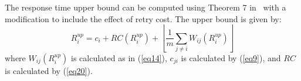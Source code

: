 \documentclass[letter]{sig-alternate}
\begin{document}
The response time upper bound can be computed using Theorem 7 in~\cite{key-2} with a modification to include the effect of retry cost. The upper bound is given by:
\begin{equation}
R_{i}^{up}=c_{i}+RC(R_{i}^{up})+\left\lfloor\frac{1}{m}\sum_{j\ne i}W_{ij}(R_{i}^{up})\right\rfloor\label{eq22}\end{equation}
where $W_{ij}(R_{i}^{up})$ is calculated as in (\ref{eq14}), $c_{ji}$ is calculated by (\ref{eq9}), and $RC$ is calculated by (\ref{eq20}).

\end{document}
